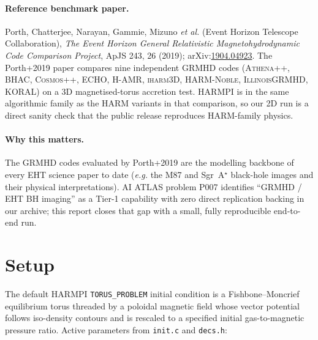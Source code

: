 \documentclass[11pt]{article}
\begin{document}
\paragraph{Reference benchmark paper.} Porth, Chatterjee, Narayan, Gammie, Mizuno
\emph{et al.} (Event Horizon Telescope Collaboration), \emph{The Event Horizon General
Relativistic Magnetohydrodynamic Code Comparison Project}, ApJS 243, 26 (2019);
arXiv:\href{https://arxiv.org/abs/1904.04923}{1904.04923}. The Porth+2019 paper compares
nine independent GRMHD codes (\textsc{Athena++}, \textsc{BHAC}, \textsc{Cosmos++},
\textsc{ECHO}, \textsc{H-AMR}, \textsc{iharm3D}, \textsc{HARM-Noble},
\textsc{IllinoisGRMHD}, \textsc{KORAL}) on a 3D magnetised-torus accretion test.
\textsc{HARMPI} is in the same algorithmic family as the \textsc{HARM} variants in that
comparison, so our 2D run is a direct sanity check that the public release reproduces
HARM-family physics.

\paragraph{Why this matters.} The GRMHD codes evaluated by Porth+2019 are the modelling
backbone of every EHT science paper to date (\emph{e.g.} the M87 and Sgr~A$^\star$
black-hole images and their physical interpretations). AI ATLAS problem P007
identifies ``GRMHD / EHT BH imaging'' as a Tier-1 capability with zero direct
replication backing in our archive; this report closes that gap with a small,
fully reproducible end-to-end run.

\section{Setup}

The default \textsc{HARMPI} \texttt{TORUS\_PROBLEM} initial condition is a
Fishbone--Moncrief equilibrium torus threaded by a poloidal magnetic field whose
vector potential follows iso-density contours and is rescaled to a specified initial
gas-to-magnetic pressure ratio. Active parameters from \texttt{init.c} and \texttt{decs.h}:
\end{document}
